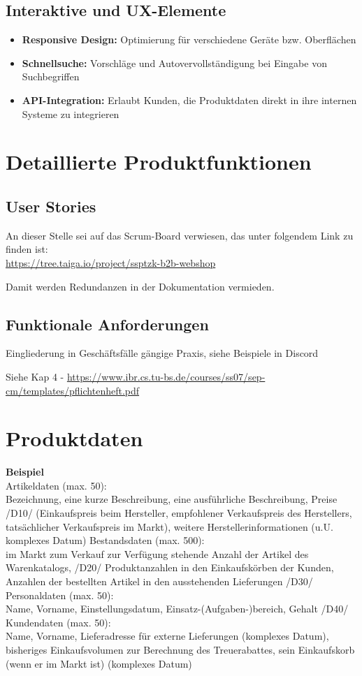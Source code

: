 \documentclass[%
	12pt,
	a4paper,
	oneside,
	parskip=full
]{scrbook}
\begin{document}
\section{Interaktive und UX-Elemente}
\begin{itemize}
	\item \textbf{Responsive Design:} Optimierung für verschiedene Geräte bzw. Oberflächen
	\item \textbf{Schnellsuche:} Vorschläge und Autovervollständigung bei Eingabe von Suchbegriffen
	\item \textbf{API-Integration:} Erlaubt Kunden, die Produktdaten direkt in ihre internen Systeme zu integrieren
\end{itemize}

\chapter{Detaillierte Produktfunktionen}
\section{User Stories}
An dieser Stelle sei auf das Scrum-Board verwiesen, das unter folgendem Link zu finden ist: \\
\url{https://tree.taiga.io/project/ssptzk-b2b-webshop}

Damit werden Redundanzen in der Dokumentation vermieden.

\section{Funktionale Anforderungen}
Eingliederung in Geschäftsfälle gängige Praxis, siehe Beispiele in Discord

Siehe Kap 4 - \url{https://www.ibr.cs.tu-bs.de/courses/ss07/sep-cm/templates/pflichtenheft.pdf}


\chapter{Produktdaten}
\textbf{Beispiel} \\
Artikeldaten (max. 50):\\
Bezeichnung, eine kurze Beschreibung, eine ausführliche Beschreibung, Preise
/D10/
(Einkaufspreis beim Hersteller, empfohlener Verkaufspreis des Herstellers,
tatsächlicher Verkaufspreis im Markt), weitere Herstellerinformationen (u.U.
komplexes Datum)
Bestandsdaten (max. 500):\\
im Markt zum Verkauf zur Verfügung stehende Anzahl der Artikel des Warenkatalogs,
/D20/
Produktanzahlen in den Einkaufskörben der Kunden, Anzahlen der bestellten Artikel in
den ausstehenden Lieferungen
/D30/ Personaldaten (max. 50):\\
Name, Vorname, Einstellungsdatum, Einsatz-(Aufgaben-)bereich, Gehalt
/D40/ Kundendaten (max. 50):\\
Name, Vorname, Lieferadresse für externe Lieferungen (komplexes Datum), bisheriges
Einkaufsvolumen zur Berechnung des Treuerabattes, sein Einkaufskorb (wenn er im
Markt ist) (komplexes Datum)
\end{document}
